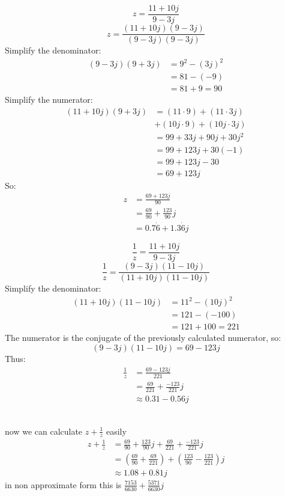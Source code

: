 \documentclass[a4paper, 12pt]{report}
\begin{document}
    \begin{minipage}[t]{0.4\textwidth}
        \[z = \frac{11 + 10j}{9 - 3j}\]    
        \[z = \frac{(11 + 10j)(9 - 3j)}{(9 - 3j)(9 - 3j)}\]
        Simplify the denominator:
        \begin{align*}
            (9 - 3j)(9 + 3j) &= 9^2 - (3j)^2\\ 
            &= 81 - (-9)\\ 
            &= 81 + 9 = 90
         \end{align*}
        Simplify the numerator:
        \begin{align*}
            (11 + 10j)(9 + 3j) &= (11 \cdot 9) + (11 \cdot 3j)\\ &+ (10j \cdot 9) + (10j \cdot 3j)\\[8pt] 
            &= 99 + 33j + 90j + 30j^2\\ 
            &= 99 + 123j + 30(-1)\\ 
            &= 99 + 123j - 30 \\
            &= 69 + 123j   
        \end{align*}
        So:
        \begin{align*}
            z &= \frac{69 + 123j}{90}\\[8pt]
            &= \frac{69}{90} + \frac{123}{90}j\\[8pt]
            &= 0.7\dot{6}+1.3\dot{6} j
        \end{align*}
    \end{minipage}\hfil%
    \begin{minipage}[t]{0.4\textwidth}
        \[\frac{1}{z} = \frac{11 + 10j}{9 - 3j}\]
        \[\frac{1}{z} = \frac{(9 - 3j)(11 - 10j)}{(11 + 10j)(11 - 10j)}\]
        Simplify the denominator:
        \begin{align*}
            (11 + 10j)(11 - 10j) &= 11^2 - (10j)^2\\
            &= 121 - (-100)\\
            &= 121 + 100 = 221
        \end{align*}
        The numerator is the conjugate of the previously calculated numerator, so:        
        \[(9 - 3j)(11 - 10j) = 69 - 123j\]
        Thus:
        \begin{align*}
            \frac{1}{z} &= \frac{69 - 123j}{221}\\[8pt]
            &= \frac{69}{221} + \frac{-123}{221}j\\[8pt]
            &\approx \boxed{0.31 - 0.56j}
        \end{align*}
    \end{minipage}\\
    \vspace{2em}
    now we can calculate $z + \frac{1}{z}$ easily
        \begin{align*}
            z+\frac{1}{z} &= \frac{69}{90} + \frac{123}{90}j + \frac{69}{221} + \frac{-123}{221}j\\[8pt]
            &= \left(\frac{69}{90}+\frac{69}{221}\right) + \left(\frac{123}{90}- \frac{123}{221}\right)j\\[8pt]
            &\boxed{\approx 1.08 + 0.81 j}
    \end{align*}
    in non approximate form this is \(\frac{7153}{6630} +\frac{5371}{6630}j \)
    
\end{document}
